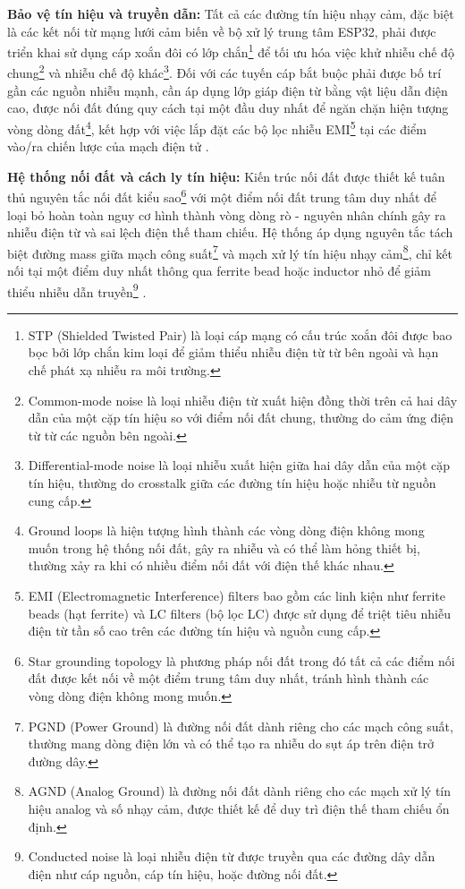 \documentclass[../main.tex]{subfiles}
\begin{document}
\textbf{Bảo vệ tín hiệu và truyền dẫn:} Tất cả các đường tín hiệu nhạy cảm, đặc biệt là các kết nối từ mạng lưới cảm biến về bộ xử lý trung tâm ESP32, phải được triển khai sử dụng cáp xoắn đôi có lớp chắn\footnote{STP (Shielded Twisted Pair) là loại cáp mạng có cấu trúc xoắn đôi được bao bọc bởi lớp chắn kim loại để giảm thiểu nhiễu điện từ từ bên ngoài và hạn chế phát xạ nhiễu ra môi trường.} để tối ưu hóa việc khử nhiễu chế độ chung\footnote{Common-mode noise là loại nhiễu điện từ xuất hiện đồng thời trên cả hai dây dẫn của một cặp tín hiệu so với điểm nối đất chung, thường do cảm ứng điện từ từ các nguồn bên ngoài.} và nhiễu chế độ khác\footnote{Differential-mode noise là loại nhiễu xuất hiện giữa hai dây dẫn của một cặp tín hiệu, thường do crosstalk giữa các đường tín hiệu hoặc nhiễu từ nguồn cung cấp.}. Đối với các tuyến cáp bắt buộc phải được bố trí gần các nguồn nhiễu mạnh, cần áp dụng lớp giáp điện từ bằng vật liệu dẫn điện cao, được nối đất đúng quy cách tại một đầu duy nhất để ngăn chặn hiện tượng vòng dòng đất\footnote{Ground loops là hiện tượng hình thành các vòng dòng điện không mong muốn trong hệ thống nối đất, gây ra nhiễu và có thể làm hỏng thiết bị, thường xảy ra khi có nhiều điểm nối đất với điện thế khác nhau.}, kết hợp với việc lắp đặt các bộ lọc nhiễu EMI\footnote{EMI (Electromagnetic Interference) filters bao gồm các linh kiện như ferrite beads (hạt ferrite) và LC filters (bộ lọc LC) được sử dụng để triệt tiêu nhiễu điện từ tần số cao trên các đường tín hiệu và nguồn cung cấp.} tại các điểm vào/ra chiến lược của mạch điện tử \cite{Espressif_ESP32_technical_reference}.

\textbf{Hệ thống nối đất và cách ly tín hiệu:} Kiến trúc nối đất được thiết kế tuân thủ nguyên tắc nối đất kiểu sao\footnote{Star grounding topology là phương pháp nối đất trong đó tất cả các điểm nối đất được kết nối về một điểm trung tâm duy nhất, tránh hình thành các vòng dòng điện không mong muốn.} với một điểm nối đất trung tâm duy nhất để loại bỏ hoàn toàn nguy cơ hình thành vòng dòng rò - nguyên nhân chính gây ra nhiễu điện từ và sai lệch điện thế tham chiếu. Hệ thống áp dụng nguyên tắc tách biệt đường mass giữa mạch công suất\footnote{PGND (Power Ground) là đường nối đất dành riêng cho các mạch công suất, thường mang dòng điện lớn và có thể tạo ra nhiễu do sụt áp trên điện trở đường dây.} và mạch xử lý tín hiệu nhạy cảm\footnote{AGND (Analog Ground) là đường nối đất dành riêng cho các mạch xử lý tín hiệu analog và số nhạy cảm, được thiết kế để duy trì điện thế tham chiếu ổn định.}, chỉ kết nối tại một điểm duy nhất thông qua ferrite bead hoặc inductor nhỏ để giảm thiểu nhiễu dẫn truyền\footnote{Conducted noise là loại nhiễu điện từ được truyền qua các đường dây dẫn điện như cáp nguồn, cáp tín hiệu, hoặc đường nối đất.} \cite{Espressif_ESP32_technical_reference}. 
\end{document}
